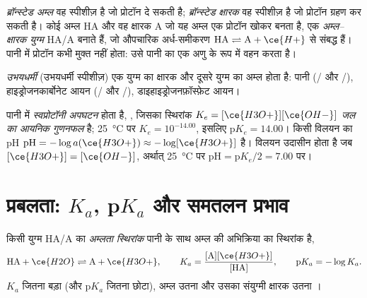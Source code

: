 \begin{definition}[ब्रॉन्स्टेड अम्ल और क्षारक, युग्म]\label{def:b1:predominant-reaction:bronsted}
\emph{ब्रॉन्स्टेड अम्ल} वह स्पीशीज़ है जो
प्रोटॉन  दे सकती है; \emph{ब्रॉन्स्टेड क्षारक} वह स्पीशीज़ है
जो प्रोटॉन ग्रहण कर सकती है। कोई अम्ल HA और वह क्षारक A जो यह अम्ल एक प्रोटॉन खोकर बनता है,
एक \emph{अम्ल--क्षारक युग्म} HA/A बनाते हैं,
जो औपचारिक अर्ध-समीकरण $\mathrm{HA} \rightleftharpoons
\mathrm{A} + \ce{H+}$ से संबद्ध हैं। पानी में प्रोटॉन कभी मुक्त नहीं होता: उसे
पानी का एक अणु  के रूप में वहन करता है।
\end{definition}

\begin{definition}[उभयधर्मी]\label{def:b1:predominant-reaction:ampholyte}
\emph{उभयधर्मी} (उभयधर्मी स्पीशीज़) एक युग्म का क्षारक
और दूसरे युग्म का अम्ल होता है: पानी (/ और
/), हाइड्रोजनकार्बोनेट आयन (/
और /), डाइहाइड्रोजनफ़ॉस्फ़ेट आयन।
\end{definition}

\begin{definition}\label{def:b1:predominant-reaction:autoprotolysis}
पानी में \emph{स्वप्रोटॉनी अपघटन} होता है,
, जिसका स्थिरांक $K_e = [\ce{H3O+}][\ce{OH-}]$
\emph{जल का आयनिक गुणनफल} है;
\qty{25}{\celsius} पर $K_e = 10^{-14.00}$, इसलिए $\mathrm{p}K_e = 14.00$। किसी विलयन का pH
$\mathrm{pH} = -\log a(\ce{H3O+}) \approx -\log[\ce{H3O+}]$ है।
विलयन उदासीन होता है जब $[\ce{H3O+}] = [\ce{OH-}]$, अर्थात्
\qty{25}{\celsius} पर $\mathrm{pH} = \mathrm{p}K_e/2 = 7.00$ पर।
\end{definition}

\section{प्रबलता: \texorpdfstring{$K_a$}{Ka}, \texorpdfstring{p$K_a$}{pKa} और समतलन प्रभाव}

\begin{definition}[अम्लता स्थिरांक]\label{def:b1:predominant-reaction:acidity-constant}
किसी युग्म HA/A का \emph{अम्लता स्थिरांक}
पानी के साथ अम्ल की अभिक्रिया का स्थिरांक है,
\[
  \mathrm{HA} + \ce{H2O} \rightleftharpoons \mathrm{A} + \ce{H3O+}, \qquad
  K_a = \frac{[\mathrm{A}][\ce{H3O+}]}{[\mathrm{HA}]}, \qquad
  \mathrm{p}K_a = -\log K_a .
\]
$K_a$ जितना बड़ा (और $\mathrm{p}K_a$ जितना छोटा), अम्ल उतना  और
उसका संयुग्मी क्षारक उतना ।
\end{definition}

